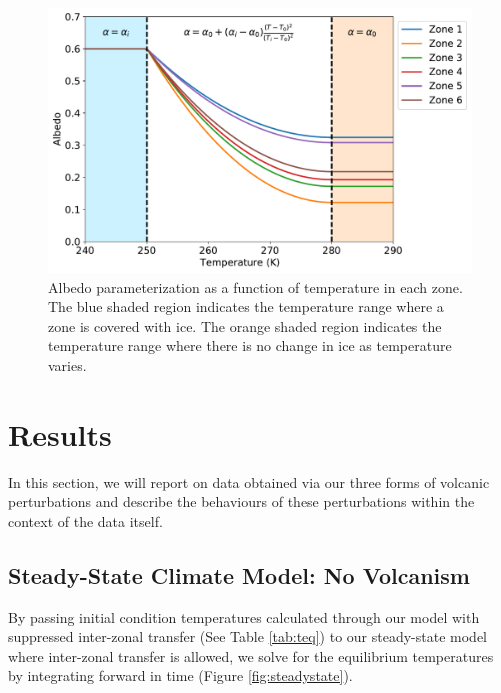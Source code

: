 \documentclass[12pt]{article}
\begin{document}
\begin{figure}[H]
    \centering
    \includegraphics[scale=0.6]{albedo.pdf}
    \caption{
        Albedo parameterization as a function of temperature in each zone.
        The blue shaded region indicates the temperature range where a zone
        is covered with ice. The orange shaded region indicates the temperature
        range where there is no change in ice as temperature varies.
    }
    \label{fig:albedotemp}
\end{figure}
\FloatBarrier

\section{Results}
\label{section:results}
In this section, we will report on data obtained via our three forms of volcanic
perturbations and describe the behaviours of these perturbations within the
context of the data itself.

\subsection{Steady-State Climate Model: No Volcanism}
By passing initial condition temperatures calculated through our model with
suppressed inter-zonal transfer (See Table \ref{tab:teq}) to our
steady-state model where inter-zonal transfer is allowed, we solve for the
equilibrium temperatures by integrating forward in time
(Figure \ref{fig:steadystate}).
\end{document}
